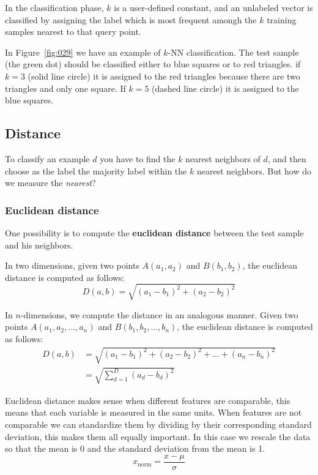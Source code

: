 In the classification phase, \(k\) is a user-defined constant, and an unlabeled vector is classified by assigning the label which is most frequent amongh the \(k\) training samples nearest to that query point.

In Figure~\ref{fig:029} we have an example of \(k\)-NN classification. The test sample (the green dot) should be classified either to blue squares or to red triangles. if \(k=3\) (solid line circle) it is assigned to the red triangles because there are two triangles and only one square. If \(k=5\) (dashed line circle) it is assigned to the blue squares.

\subsection{Distance}
To classify an example \(d\) you have to find the \(k\) nearest neighbors of \(d\), and then choose as the label the majority label within the \(k\) nearest neighbors. But how do we measure the \emph{nearest}?

\subsubsection{Euclidean distance}
One possibility is to compute the \textbf{euclidean distance} between the test sample and  his neighbors.

In two dimensions, given two points \(A(a_1, a_2)\) and \(B(b_1, b_2)\), the euclidean distance is computed as follows:
\[D(a,b) = \sqrt{(a_1-b_1)^2 + (a_2-b_2)^2}\]

In \(n\)-dimensions, we compute the distance in an analogous manner. Given two points \(A(a_1, a_2, ..., a_n)\) and \(B(b_1, b_2, ..., b_n)\), the euclidean distance is computed as follows:
\begin{align}
D(a,b)  &= \sqrt{(a_1-b_1)^2 + (a_2-b_2)^2 + ... + (a_n-b_n)^2}\\
        &=\sqrt{\sum_{d=1}^D(a_d-b_d)^2}
\end{align}

Euclidean distance makes sense when different features are comparable, this means that each variable is measured in the same units. When features are not comparable we can standardize them by dividing by their corresponding standard deviation, this makes them all equally important. In this case we rescale the data so that the mean is 0 and the standard deviation from the mean is 1.
\begin{equation*}
    x_\text{norm} = \frac {x - \mu} {\sigma}
\end{equation*}


